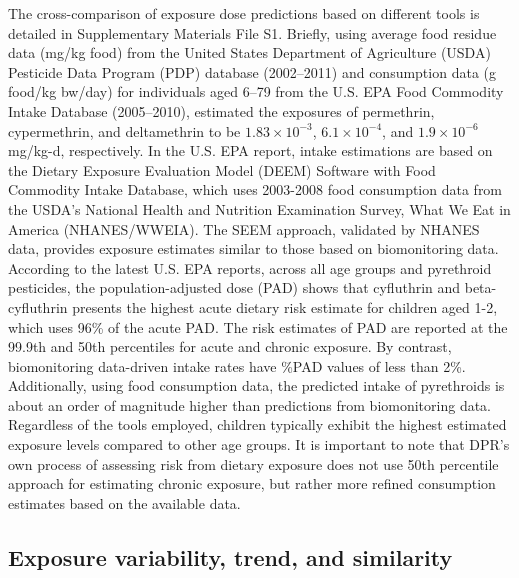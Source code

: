 \documentclass[toxics,article,submit,pdftex,moreauthors]{Definitions/mdpi}
\begin{document}
The cross-comparison of exposure dose predictions based on different
tools is detailed in Supplementary Materials File S1. Briefly, using
average food residue data (mg/kg food) from the United States Department
of Agriculture (USDA) Pesticide Data Program (PDP) database (2002--2011)
and consumption data (g food/kg bw/day) for individuals aged 6--79 from
the U.S. EPA Food Commodity Intake Database (2005--2010),
\citet{aylward_screening_level_2018} estimated the exposures of
permethrin, cypermethrin, and deltamethrin to be
\(1.83 \times 10^{-3}\), \(6.1 \times
10^{-4}\), and \(1.9 \times 10^{-6}\) mg/kg-d, respectively. In the U.S.
EPA report, intake estimations are based on the Dietary Exposure
Evaluation Model (DEEM) Software with Food Commodity Intake Database,
which uses 2003-2008 food consumption data from the USDA's National
Health and Nutrition Examination Survey, What We Eat in America
(NHANES/WWEIA). The SEEM approach, validated by NHANES data, provides
exposure estimates similar to those based on biomonitoring data.
According to the latest U.S. EPA reports, across all age groups and
pyrethroid pesticides, the population-adjusted dose (PAD) shows that
cyfluthrin and beta-cyfluthrin presents the highest acute dietary risk
estimate for children aged 1-2, which uses 96\% of the acute PAD. The
risk estimates of PAD are reported at the 99.9th and 50th percentiles
for acute and chronic exposure. By contrast, biomonitoring data-driven
intake rates have \%PAD values of less than 2\%. Additionally, using
food consumption data, the predicted intake of pyrethroids is about an
order of magnitude higher than predictions from biomonitoring data.
Regardless of the tools employed, children typically exhibit the highest
estimated exposure levels compared to other age groups. It is important
to note that DPR's own process of assessing risk from dietary exposure
does not use 50th percentile approach for estimating chronic exposure,
but rather more refined consumption estimates based on the available
data.

\subsection{Exposure variability, trend, and
similarity}\label{exposure-variability-trend-and-similarity}
\end{document}
